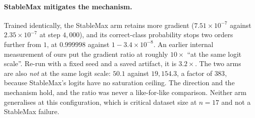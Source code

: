 \paragraph{StableMax mitigates the mechanism.} Trained identically, the StableMax arm retains
more gradient ($7.51 \times 10^{-7}$ against $2.35 \times 10^{-7}$ at step $4{,}000$), and its
correct-class probability stops two orders further from $1$, at $0.999998$ against
$1 - 3.4 \times 10^{-8}$. An earlier internal measurement of ours put the gradient ratio at
roughly $10\times$ ``at the same logit scale''. Re-run with a fixed seed and a saved artifact,
it is $3.2\times$. The two arms are also \emph{not} at the same logit scale: $50.1$ against
$19{,}154.3$, a factor of $383$, because StableMax's logits have no saturation ceiling. The
direction and the mechanism hold, and the ratio was never a like-for-like comparison. Neither
arm generalises at this configuration, which is critical dataset size at $n = 17$ and not a
StableMax failure.
